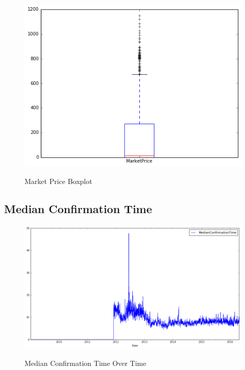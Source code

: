 \begin{figure}[bth]
  \myfloatalign
  {\includegraphics[width=1\linewidth]
    {gfx/market-price-boxplot}}
  \caption{Market Price Boxplot}
  \label{fig:market-price-boxplot}
\end{figure}

\clearpage

\subsection{Median Confirmation Time}
\label{sec:median-confirmation-time}

\begin{figure}[bth]
  \myfloatalign
  {\includegraphics[width=1\linewidth]
    {gfx/median-confirmation-time-over-time}}
  \caption{Median Confirmation Time Over Time}
  \label{fig:median-confirmation-time-over-time}
\end{figure}

